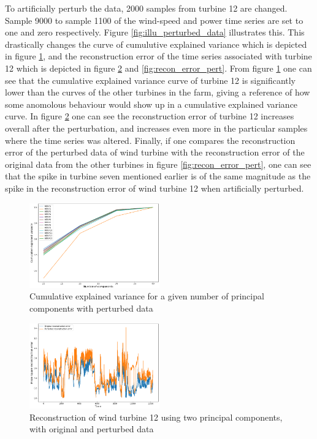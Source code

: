 To artificially perturb the data, 2000 samples from turbine 12 are changed. 
Sample 9000 to sample 1100 of the wind-speed and power time series are set to one and zero respectively.
Figure \ref{fig:illu_perturbed_data} illustrates this. 
This drastically changes the curve of cumulutive explained variance which is depicted in figure \ref{fig:cum_exp_var_pert}, and the reconstruction error of the time series associated with turbine 12 which is depicted in figure \ref{fig:recon_error_pert_vs_unpert} and \ref{fig:recon_error_pert}.
From figure \ref{fig:cum_exp_var_pert} one can see that the cumulative explained variance curve of turbine 12 is significantly lower than the curves of the other turbines in the farm, giving a reference of how some anomolous behaviour would show up in a cumulative explained variance curve. 
In figure \ref{fig:recon_error_pert_vs_unpert} one can see the reconstruction error of turbine 12 increases overall after the perturbation, and increases even more in the particular samples where the time series was altered. 
Finally, if one compares the reconstruction error of the perturbed data of wind turbine with the reconstruction error of the original data from the other turbines in figure \ref{fig:recon_error_pert}, one can see that the spike in turbine seven mentioned earlier is of the same magnitude as the spike in the reconstruction error of wind turbine 12 when artificially perturbed. 

\begin{figure}
    \begin{center}
    \includegraphics[width=0.5\textwidth]{data_exp/explained_variance_perturbed}
    \end{center}
    \caption{Cumulative explained variance for a given number of principal components with perturbed data} 
    \label{fig:cum_exp_var_pert}
\end{figure}

\begin{figure}
    \begin{center}
    \includegraphics[width=0.5\textwidth]{data_exp/pert_vs_unpert_reconstruction_error}
    \end{center}
    \caption{Reconstruction of wind turbine 12 using two principal components, with original and perturbed data} 
    \label{fig:recon_error_pert_vs_unpert}
\end{figure}

